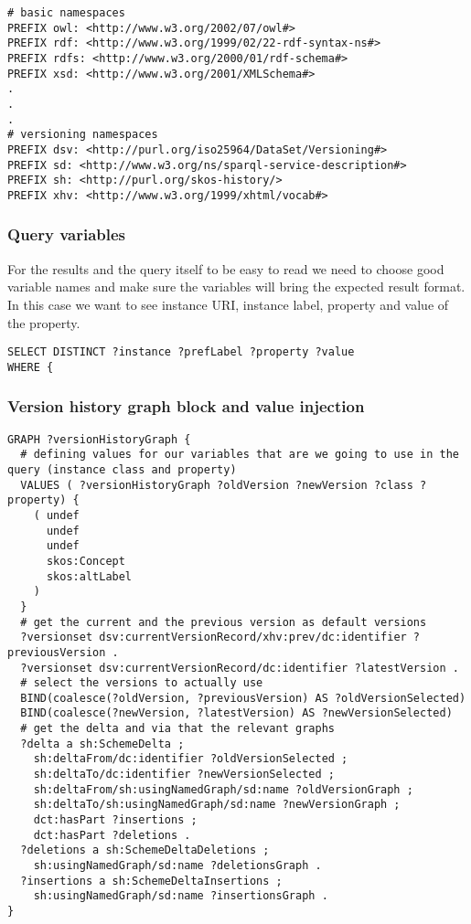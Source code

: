 \begin{lstlisting}
# basic namespaces
PREFIX owl: <http://www.w3.org/2002/07/owl#>
PREFIX rdf: <http://www.w3.org/1999/02/22-rdf-syntax-ns#>
PREFIX rdfs: <http://www.w3.org/2000/01/rdf-schema#>
PREFIX xsd: <http://www.w3.org/2001/XMLSchema#>
.
.
.
# versioning namespaces
PREFIX dsv: <http://purl.org/iso25964/DataSet/Versioning#>
PREFIX sd: <http://www.w3.org/ns/sparql-service-description#>
PREFIX sh: <http://purl.org/skos-history/>
PREFIX xhv: <http://www.w3.org/1999/xhtml/vocab#>
\end{lstlisting}

\subsubsection{Query variables}
For the results and the query itself to be easy to read we need to choose good variable names and make sure the variables will bring the expected result format. In this case we want to see instance URI, instance label, property and value of the property.

\begin{lstlisting}
SELECT DISTINCT ?instance ?prefLabel ?property ?value 
WHERE {
\end{lstlisting}

\subsubsection{Version history graph block and value injection}

\begin{lstlisting}
GRAPH ?versionHistoryGraph {
  # defining values for our variables that are we going to use in the query (instance class and property)
  VALUES ( ?versionHistoryGraph ?oldVersion ?newVersion ?class ?property) {
    ( undef
      undef
      undef
      skos:Concept 
      skos:altLabel 
    )
  }
  # get the current and the previous version as default versions
  ?versionset dsv:currentVersionRecord/xhv:prev/dc:identifier ?previousVersion .
  ?versionset dsv:currentVersionRecord/dc:identifier ?latestVersion .
  # select the versions to actually use
  BIND(coalesce(?oldVersion, ?previousVersion) AS ?oldVersionSelected)
  BIND(coalesce(?newVersion, ?latestVersion) AS ?newVersionSelected)
  # get the delta and via that the relevant graphs
  ?delta a sh:SchemeDelta ;
    sh:deltaFrom/dc:identifier ?oldVersionSelected ;
    sh:deltaTo/dc:identifier ?newVersionSelected ;
    sh:deltaFrom/sh:usingNamedGraph/sd:name ?oldVersionGraph ;
    sh:deltaTo/sh:usingNamedGraph/sd:name ?newVersionGraph ;
    dct:hasPart ?insertions ;
    dct:hasPart ?deletions .
  ?deletions a sh:SchemeDeltaDeletions ;
    sh:usingNamedGraph/sd:name ?deletionsGraph .
  ?insertions a sh:SchemeDeltaInsertions ;
    sh:usingNamedGraph/sd:name ?insertionsGraph .
}
\end{lstlisting}


